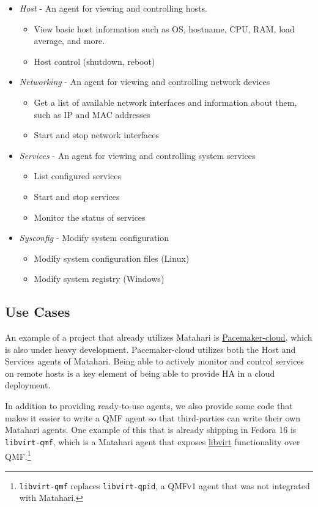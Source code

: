 \begin{itemize}

    \item \emph{Host} - An agent for viewing and controlling hosts.
    \begin{itemize}
        \item View basic host information such as OS, hostname, CPU, RAM, load average, and more.
        \item Host control (shutdown, reboot) 
    \end{itemize}

    \item \emph{Networking} - An agent for viewing and controlling network devices
    \begin{itemize}
        \item Get a list of available network interfaces and information about them, such as IP and MAC addresses
        \item Start and stop network interfaces 
    \end{itemize}

    \item \emph{Services} - An agent for viewing and controlling system services
    \begin{itemize}
        \item List configured services
        \item Start and stop services
        \item Monitor the status of services 
    \end{itemize}

    \item \emph{Sysconfig} - Modify system configuration
    \begin{itemize}
        \item Modify system configuration files (Linux)
        \item Modify system registry (Windows) 
    \end{itemize}

\end{itemize}

\subsection{Use Cases}

An example of a project that already utilizes Matahari is \href{http://pacemaker-cloud.org/}{Pacemaker-cloud}, which is also under heavy development. Pacemaker-cloud utilizes both the Host and Services agents of Matahari. Being able to actively monitor and control services on remote hosts is a key element of being able to provide HA in a cloud deployment.

In addition to providing ready-to-use agents, we also provide some code that makes it easier to write a QMF agent so that third-parties can write their own Matahari agents. One example of this that is already shipping in Fedora 16 is \texttt{libvirt-qmf}, which is a Matahari agent that exposes \href{http://libvirt.org/}{libvirt} functionality over QMF.\footnote{\texttt{libvirt-qmf} replaces \texttt{libvirt-qpid}, a QMFv1 agent that was not integrated with Matahari.}

